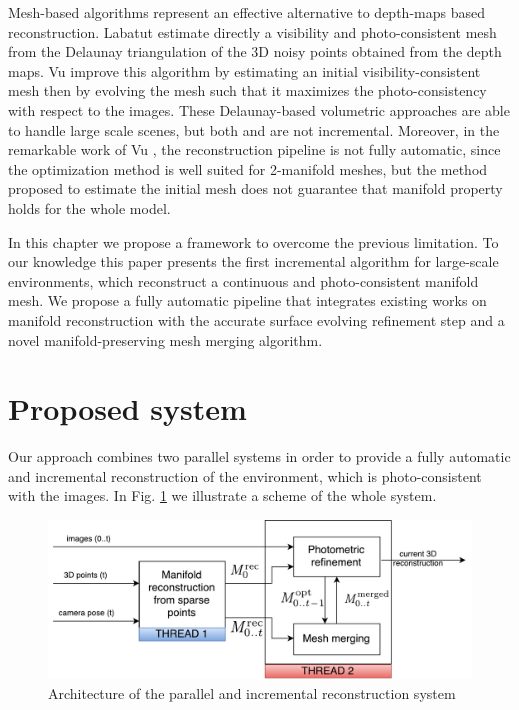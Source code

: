 Mesh-based algorithms represent an effective alternative to depth-maps based reconstruction. Labatut \etal \cite{labatut2007efficient} estimate directly a visibility and photo-consistent mesh from the Delaunay triangulation of the 3D noisy points obtained from the depth maps.
Vu \etal  \cite{vu_et_al_2012} improve this algorithm by estimating an initial visibility-consistent mesh then by evolving the mesh such that it maximizes the photo-consistency with respect to the images. 
These Delaunay-based volumetric approaches are able to handle large scale scenes, but both \cite{labatut2007efficient} and \cite{vu_et_al_2012}  are not incremental.
Moreover, in the remarkable work of Vu \etal \cite{vu_et_al_2012}, the reconstruction pipeline   is not fully automatic, since the optimization method is well suited for 2-manifold meshes, but the method proposed to estimate the initial mesh does not guarantee that manifold property holds for the whole model.



In this chapter we propose a framework to overcome the previous limitation.
To our knowledge this paper presents the first incremental algorithm for large-scale environments, which reconstruct a continuous and photo-consistent manifold mesh. 
We propose a fully automatic pipeline that integrates existing works on manifold reconstruction with the accurate surface evolving refinement step and a novel manifold-preserving mesh merging algorithm.


\section{Proposed system}
 Our approach combines two parallel systems in order to provide a fully automatic and incremental reconstruction of the environment, which is photo-consistent with the images. In Fig. \ref{fig:architecture} we illustrate a scheme of the whole system.
 
 \begin{figure}[t]
  \centering
  \includegraphics[width=\textwidth]{./img/ch-incr-dens/incremental-mvs-architecture}
  \caption{Architecture of the parallel and incremental reconstruction system}
  \label{fig:architecture}
\end{figure}


